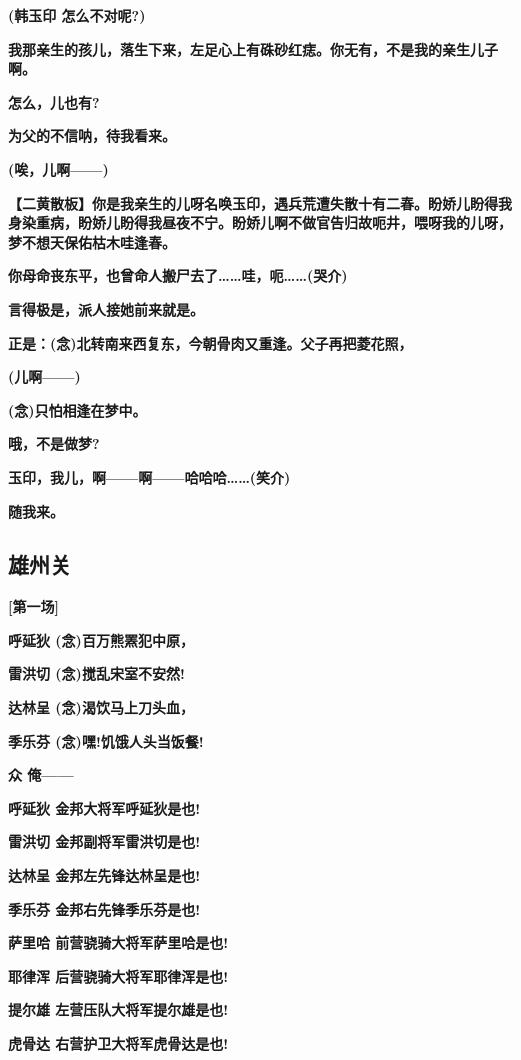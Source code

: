 \textbf{(韩玉印 怎么不对呢?)}

\textbf{我那亲生的孩儿，落生下来，左足心上有硃砂红痣。你无有，不是我的亲生儿子啊。}

\textbf{怎么，儿也有?}

\textbf{为父的不信呐，待我看来。}

\textbf{(唉，儿啊------)}

\textbf{【二黄散板】你是我亲生的儿呀名唤玉印，遇兵荒遭失散十有二春。盼娇儿盼得我身染重病，盼娇儿盼得我昼夜不宁。盼娇儿啊不做官告归故呃井，喂呀我的儿呀，梦不想天保佑枯木哇逢春。}

\textbf{你母命丧东平，也曾命人搬尸去了\ldots{}\ldots{}哇，呃\ldots{}\ldots{}(哭介)}

\textbf{言得极是，派人接她前来就是。}

\textbf{正是：(念)北转南来西复东，今朝骨肉又重逢。父子再把菱花照，}

\textbf{(儿啊------)}

\textbf{(念)只怕相逢在梦中。}

\textbf{哦，不是做梦?}

\textbf{玉印，我儿，啊------啊------哈哈哈\ldots{}\ldots{}(笑介)}

\textbf{随我来。}

\hypertarget{ux96c4ux5ddeux5173}{%
\subsection{雄州关}\label{ux96c4ux5ddeux5173}}

\textbf{{[}第一场{]}}

\textbf{呼延狄 (念)百万熊罴犯中原，}

\textbf{雷洪切 (念)搅乱宋室不安然!}

\textbf{达林呈 (念)渴饮马上刀头血，}

\textbf{季乐芬 (念)嘿!饥饿人头当饭餐!}

\textbf{众 俺------}

\textbf{呼延狄 金邦大将军呼延狄是也!}

\textbf{雷洪切 金邦副将军雷洪切是也!}

\textbf{达林呈 金邦左先锋达林呈是也!}

\textbf{季乐芬 金邦右先锋季乐芬是也!}

\textbf{萨里哈 前营骁骑大将军萨里哈是也!}

\textbf{耶律浑 后营骁骑大将军耶律浑是也!}

\textbf{提尔雄 左营压队大将军提尔雄是也!}

\textbf{虎骨达 右营护卫大将军虎骨达是也!}

